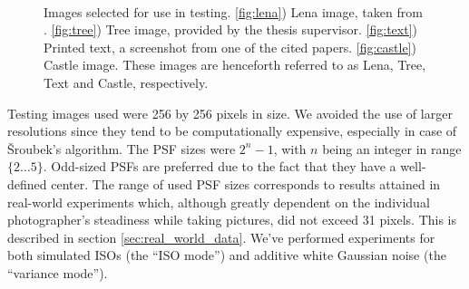 \documentclass[12pt,notitlepage]{report}
\begin{document}
\begin{figure}[htb]
  \centering
	  ~
	  ~
	  ~
  \caption[Images selected for use in testing]{Images selected for use in testing. \ref{fig:lena}) Lena image, taken from  \cite{uscimgdb}. \ref{fig:tree}) Tree image, provided by the thesis supervisor. \ref{fig:text}) Printed text, a screenshot from one of the cited papers. \ref{fig:castle}) Castle image. These images are henceforth referred to as Lena, Tree, Text and Castle, respectively.}
  \label{fig:used_images}
\end{figure}

Testing images used were 256 by 256 pixels in size. We avoided the use of larger resolutions since they tend to be computationally expensive, especially in case of Šroubek's algorithm. The PSF sizes were $2^n - 1$, with $n$ being an integer in range $\lbrace 2 \dots 5 \rbrace$. Odd-sized PSFs are preferred due to the fact that they have a well-defined center. The range of used PSF sizes corresponds to results attained in real-world experiments which, although greatly dependent on the individual photographer's steadiness while taking pictures,  did not exceed 31 pixels. This is described in section \ref{sec:real_world_data}. We've performed experiments for both simulated ISOs (the ``ISO mode'') and additive white Gaussian noise  (the ``variance mode'').
\end{document}
